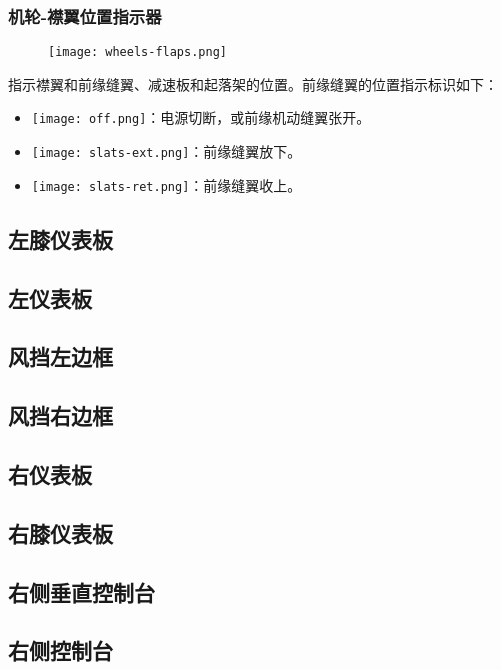 \subsubsection{机轮-襟翼位置指示器}

\begin{figure}[h]
  \center
  \texttt{[image: wheels-flaps.png]}
\end{figure}
指示襟翼和前缘缝翼、减速板和起落架的位置。前缘缝翼的位置指示标识如下：
\begin{itemize}
  \item \texttt{[image: off.png]}：电源切断，或前缘机动缝翼张开。
  \item \texttt{[image: slats-ext.png]}：前缘缝翼放下。
  \item \texttt{[image: slats-ret.png]}：前缘缝翼收上。
\end{itemize}

\subsection{左膝仪表板}

\subsection{左仪表板}

\subsection{风挡左边框}

\subsection{风挡右边框}

\subsection{右仪表板}

\subsection{右膝仪表板}

\subsection{右侧垂直控制台}

\subsection{右侧控制台}

